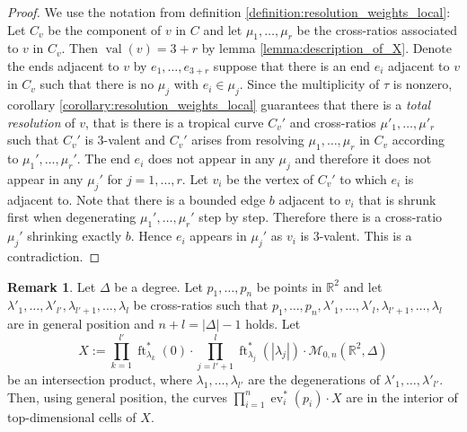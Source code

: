 \documentclass[11pt,reqno,a4]{amsart}
\theoremstyle{dotless}
\theoremstyle{definition}
\newtheorem{remark}[corollary]{Remark}
\newcommand{\ft}{\operatorname{ft}}
\newcommand{\ev}{\operatorname{ev}}
\newcommand{\val}{\operatorname{val}}
\begin{document}
\begin{proof}
We use the notation from definition \ref{definition:resolution_weights_local}: Let $C_v$ be the component of $v$ in $C$ and let $\mu_1,\dots,\mu_r$ be the cross-ratios associated to $v$ in $C_v$. Then $\val(v)=3+r$ by lemma \ref{lemma:description_of_X}. Denote the ends adjacent to $v$ by $e_1,\dots, e_{3+r}$ suppose that there is an end $e_i$ adjacent to $v$ in $C_v$ such that there is no $\mu_j$ with $e_i\in\mu_j$. Since the multiplicity of $\tau$ is nonzero, corollary \ref{corollary:resolution_weights_local} guarantees that there is a \textit{total resolution} of $v$, that is there is a tropical curve $C_v'$ and cross-ratios $\mu'_1,\dots,\mu'_r$ such that $C_v'$ is $3$-valent and $C_v'$ arises from resolving $\mu_1,\dots,\mu_r$ in $C_v$ according to $\mu_1',\dots,\mu_r'$. The end $e_i$ does not appear in any $\mu_j$ and therefore it does not appear in any $\mu_j'$ for $j=1,\dots,r$. Let $v_i$ be the vertex of $C_v'$ to which $e_i$ is adjacent to. Note that there is a bounded edge $b$ adjacent to $v_i$ that is shrunk first when degenerating $\mu_1',\dots,\mu_r'$ step by step. Therefore there is a cross-ratio $\mu_j'$ shrinking exactly $b$. Hence $e_i$ appears in $\mu_j'$ as $v_i$ is $3$-valent. This is a contradiction.
\end{proof}


\begin{remark}\label{corollary:mult_ev_well-def}
Let $\Delta$ be a degree. Let $p_1,\dots,p_n$ be points in $\mathbb{R}^2$ and let $\lambda'_1,\dots,\lambda'_{l'},\lambda_{l'+1},\dots,\lambda_l$ be cross-ratios such that $p_1,\dots,p_n,\lambda'_1,\dots,\lambda'_l,\lambda_{l'+1},\dots,\lambda_l$ are in general position and $n+l=|\Delta|-1$ holds. Let
$$X:=\prod_{k=1}^{l'}\ft_{\lambda_k}^*\left( 0\right)\cdot\prod_{j=l'+1}^{l}\ft_{\lambda_j}^*\left( |\lambda_j|\right)\cdot\mathcal{M}_{0,n}\left(\mathbb{R}^2,\Delta \right)$$ be an intersection product, where $\lambda_1,\dots,\lambda_{l'}$ are the degenerations of $\lambda'_1,\dots,\lambda'_{l'}$. Then, using general position, the curves $\prod_{i=1}^n\ev_i^*\left( p_i\right)\cdot X$ are in the interior of top-dimensional cells of $X$.
\end{remark}
\end{document}
